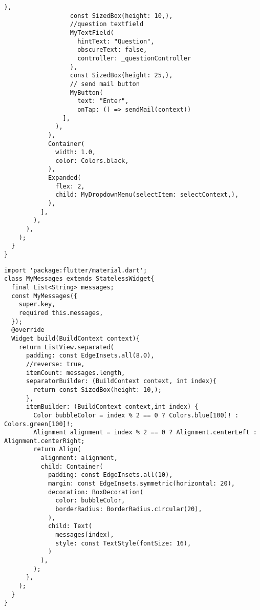 \begin{lstlisting}[style=pythonstyle,caption={Codice del my\_mail\_chat.dart}, label={lst:mailchat}]
                  ),
                  const SizedBox(height: 10,),
                  //question textfield
                  MyTextField(
                    hintText: "Question",
                    obscureText: false,
                    controller: _questionController
                  ),
                  const SizedBox(height: 25,),
                  // send mail button
                  MyButton( 
                    text: "Enter",
                    onTap: () => sendMail(context))
                ],
              ),
            ),
            Container(
              width: 1.0,
              color: Colors.black,
            ),
            Expanded(
              flex: 2,
              child: MyDropdownMenu(selectItem: selectContext,),
            ),
          ],
        ),
      ),
    );
  }
}
\end{lstlisting}
\begin{lstlisting}[style=pythonstyle,caption={Codice del my\_messages.dart}, label={lst:messages}]
import 'package:flutter/material.dart';
class MyMessages extends StatelessWidget{
  final List<String> messages;
  const MyMessages({
    super.key,
    required this.messages,
  });
  @override
  Widget build(BuildContext context){
    return ListView.separated(
      padding: const EdgeInsets.all(8.0),
      //reverse: true,
      itemCount: messages.length,
      separatorBuilder: (BuildContext context, int index){
        return const SizedBox(height: 10,);
      },
      itemBuilder: (BuildContext context,int index) {
        Color bubbleColor = index % 2 == 0 ? Colors.blue[100]! : Colors.green[100]!;
        Alignment alignment = index % 2 == 0 ? Alignment.centerLeft : Alignment.centerRight;
        return Align(
          alignment: alignment,
          child: Container(
            padding: const EdgeInsets.all(10),
            margin: const EdgeInsets.symmetric(horizontal: 20),
            decoration: BoxDecoration(
              color: bubbleColor,
              borderRadius: BorderRadius.circular(20),
            ),
            child: Text(
              messages[index],
              style: const TextStyle(fontSize: 16),
            )
          ),
        );
      },
    );
  }
}
\end{lstlisting}
